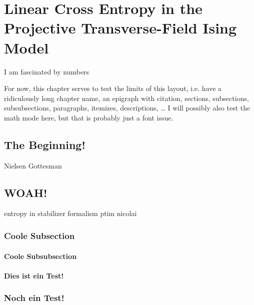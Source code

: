 \chapter{Linear Cross Entropy in the Projective Transverse-Field Ising Model}
\label{ch:lxe-ptim}
\epigraph{I am fascinated by numbers}{
\citeauthor{baron-cohenAutismSpectrumQuotientAQ2001}
\cite{baron-cohenAutismSpectrumQuotientAQ2001}}

For now, this chapter serves to test the limits of this layout, i.e. have a
ridiculously long chapter name, an epigraph with citation, sections,
subsections, subsubsections, paragraphs, itemizes, descriptions, \ldots
I will possibly also test the math mode here, but that is probably just a font
issue.
\section{The Beginning!}
\lipsum[0-2]
Nielsen \cite{nielsenQuantumComputationQuantum2010} Gottesman
\cite{gottesmanStabilizerCodesQuantum1997}
\cite{aaronsonImprovedSimulationStabilizer2004}
\section{WOAH!}
\lipsum[3]
entropy in stabilizer formalism
\cite{fattalEntanglementStabilizerFormalism2004}
ptim nicolai \cite{langEntanglementTransitionProjective2020}
\subsection{Coole Subsection}
\lipsum[4-6]
\cite{roserDecodingProjectiveTransverse2023}
\subsubsection{Coole Subsubsection}
\lipsum[7-9]
\subsubsection{Dies ist ein Test!}
\lipsum[10-11]
\subsection{Noch ein Test!}
\lipsum[12-14]
